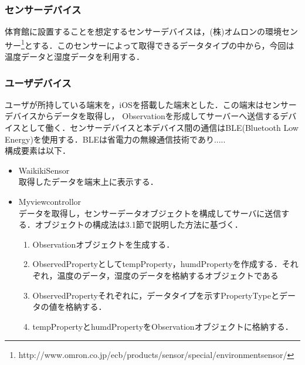 \documentclass{kuisthesis}			%
\begin{document}
\subsubsection{センサーデバイス}
体育館に設置することを想定するセンサーデバイスは，(株)オムロンの環境センサー\footnote{http://www.omron.co.jp/ecb/products/sensor/special/environmentsensor/}とする．このセンサーによって取得できるデータタイプの中から，今回は温度データと湿度データを利用する．
\subsubsection{ユーザデバイス}
ユーザが所持している端末を，iOSを搭載した端末とした．この端末はセンサーデバイスからデータを取得し， Observationを形成してサーバーへ送信するデバイスとして働く．センサーデバイスと本デバイス間の通信はBLE(Bluetooth Low Energy)を使用する．BLEは省電力の無線通信技術であり..... \\
構成要素は以下．
\begin{itemize}
\item WaikikiSensor\\
取得したデータを端末上に表示する．
\item Myviewcontrollor\\
データを取得し，センサーデータオブジェクトを構成してサーバに送信する．オブジェクトの構成法は3.1節で説明した方法に基づく．
\begin{enumerate}
\item Observationオブジェクトを生成する．
\item ObservedPropertyとしてtempProperty，humdPropertyを作成する．それぞれ，温度のデータ，湿度のデータを格納するオブジェクトである
\item ObservedPropertyそれぞれに，データタイプを示すPropertyTypeとデータの値を格納する．
\item tempPropertyとhumdPropertyをObservationオブジェクトに格納する．
\end{enumerate}
\end{itemize}
\end{document}
